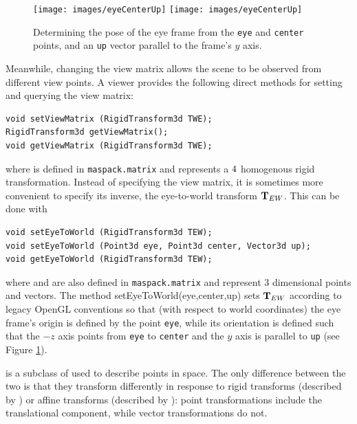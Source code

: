 %
\begin{figure}[t]
\begin{center}
\iflatexml
 \texttt{[image: images/eyeCenterUp]}
\else
 \texttt{[image: images/eyeCenterUp]}
\fi
\end{center}
\caption{Determining the pose of the eye frame from the {\tt eye} and
{\tt center} points, and an {\tt up} vector parallel to the frame's
$y$ axis.}
\label{eyeCenterUp:fig}
\end{figure}
%
Meanwhile, changing the view matrix allows the scene to be
observed from different view points. A viewer provides the following
direct methods for setting and querying the view matrix:
%
\begin{lstlisting}[]
void setViewMatrix (RigidTransform3d TWE);
RigidTransform3d getViewMatrix();
void getViewMatrix (RigidTransform3d TWE);
\end{lstlisting}
%
where 
 is defined
in {\tt maspack.matrix} and represents a $4 \time 4$ homogenous
rigid transformation.
Instead of specifying the view matrix, it is sometimes more convenient
to specify its inverse, the eye-to-world transform ${\bf T}_{EW}$.
This can be done with
%
\begin{lstlisting}[]
void setEyeToWorld (RigidTransform3d TEW);
void setEyeToWorld (Point3d eye, Point3d center, Vector3d up);
void getEyeToWorld (RigidTransform3d TEW);
\end{lstlisting}
%
where 
 and
 are also defined in 
{\tt maspack.matrix} and represent 3 dimensional points and vectors.
The method
%
{setEyeToWorld(eye,center,up)} sets ${\bf T}_{EW}$ according to legacy
OpenGL conventions so that (with respect to world coordinates) the eye
frame's origin is defined by the point {\tt eye}, while its
orientation is defined such that the $-z$ axis points from {\tt eye}
to {\tt center} and the $y$ axis is parallel to {\tt up} (see Figure
\ref{eyeCenterUp:fig}).

\begin{sideblock}
 is a subclass of
 used to describe points in
space. The only difference between the two is that they transform
differently in response to rigid transforms (described by
) or affine transforms
(described by ): point
transformations include the translational component, while vector
transformations do not.
\end{sideblock}

